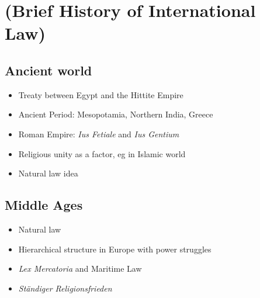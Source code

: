 \section{(Brief History of International Law)}

\subsection{Ancient world}

\begin{itemize}
\itemsep1pt\parskip0pt
\item
  Treaty between Egypt and the Hittite Empire
\item
  Ancient Period: Mesopotamia, Northern India, Greece
\item
  Roman Empire: \emph{Ius Fetiale} and \emph{Ius Gentium}
\item
  Religious unity as a factor, eg in Islamic world
\item
  Natural law idea
\end{itemize}

\subsection{Middle Ages}

\begin{itemize}
\itemsep1pt\parskip0pt
\item
  Natural law
\item
  Hierarchical structure in Europe with power struggles
\item
  \emph{Lex Mercatoria} and Maritime Law
\item
  \emph{Ständiger Religionsfrieden}
\end{itemize}
